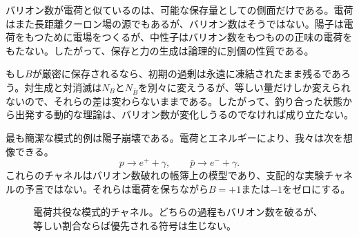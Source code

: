 バリオン数が電荷と似ているのは、可能な保存量としての側面だけである。電荷はまた長距離クーロン場の源でもあるが、バリオン数はそうではない。陽子は電荷をもつために電場をつくるが、中性子はバリオン数をもつものの正味の電荷をもたない。したがって、保存と力の生成は論理的に別個の性質である。

\begin{classroomqa}
\end{classroomqa}

もし\(B\)が厳密に保存されるなら、初期の過剰は永遠に凍結されたまま残るであろう。対生成と対消滅は\(N_B\)と\(N_{\bar B}\)を別々に変えうるが、等しい量だけしか変えられないので、それらの差は変わらないままである。したがって、釣り合った状態から出発する動的な理論は、バリオン数が変化しうるのでなければ成り立たない。

最も簡潔な模式的例は陽子崩壊である。電荷とエネルギーにより、我々は次を想像できる。
\begin{equation}
p\longrightarrow e^+ +\gamma,
\qquad
\bar p\longrightarrow e^-+\gamma.
\label{eq:c08-decay-pair}
\end{equation}
これらのチャネルはバリオン数破れの帳簿上の模型であり、支配的な実験チャネルの予言ではない。それらは電荷を保ちながら\(B=+1\)または\(-1\)をゼロにする。

\begin{figure}[htbp]
\centering
\begin{coursefitfigure}
\end{coursefitfigure}
\caption{電荷共役な模式的チャネル。どちらの過程もバリオン数を破るが、等しい割合ならば優先される符号は生じない。}
\label{fig:c08-decay-redraw}
\end{figure}

